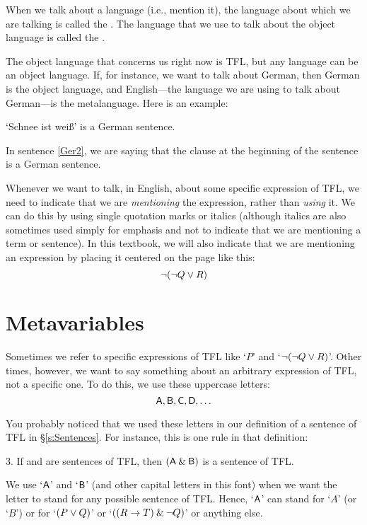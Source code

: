 When we talk about a language (i.e., mention it), the language about which we are talking is called the . The language that we use to talk about the object language is called the .\label{def.metalanguage} 

The object language that concerns us right now is TFL, but any language can be an object language. If, for instance, we want to talk about German, then German is the object language, and English---the language we are using to talk about German---is the metalanguage. Here is an example:
	\begin{earg}
		\item[\ex{Ger2}]`Schnee ist wei\ss' is a German sentence.
	\end{earg}
In sentence \ref{Ger2}, we are saying that the clause at the beginning of the sentence is a German sentence. 

Whenever we want to talk, in English, about some specific expression of TFL, we need to indicate that we are \textit{mentioning} the expression, rather than \textit{using} it. We can do this by using single quotation marks or italics (although italics are also sometimes used simply for emphasis and not to indicate that we are mentioning a term or sentence). In this textbook, we will also indicate that we are mentioning an expression by placing it centered on the page like this:
\vspace{-2mm}
$${\neg}({\neg} Q \vee R)$$

\section{Metavariables}\label{s:Metavariables}

Sometimes we refer to specific expressions of TFL like `$P$' and `${\neg} ({\neg} Q \vee R)$'. Other times, however, we want to say something about an arbitrary expression of TFL, not a specific one. To do this, we use these uppercase letters:
\vspace{-2mm}
	$$\mathsf{A}, \mathsf{B}, \mathsf{C}, \mathsf{D}, \ldots$$
	
You probably noticed that we used these letters in our definition of a sentence of TFL in \S\ref{s:Sentences}. For instance, this is one rule in that definition:
\begin{earg}
\item[3.] If  and  are sentences of TFL, then $(\mathsf{A}\mathbin{\&}\mathsf{B})$ is a sentence of TFL.
\end{earg}
We use `$\mathsf{A}$' and `$\mathsf{B}$' (and other capital letters in this font) when we want the letter to stand for any possible sentence of TFL. Hence, `$\mathsf{A}$' can stand for `$A$' (or `$B$') or for `$(P \vee Q)$' or `$((R \rightarrow T) \mathbin{\&} {\neg} Q)$' or anything else. 

